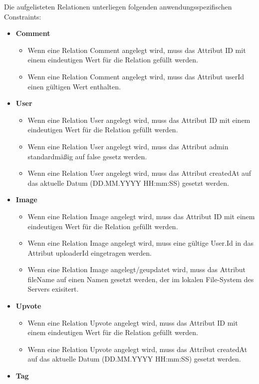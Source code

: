 \documentclass[12pt, oneside, a4paper]{article}		%
\begin{document}
Die aufgelisteten Relationen unterliegen folgenden anwendungsspezifischen Constraints:

\begin{itemize}
	\item \textbf{Comment}
	\begin{itemize}
		\item Wenn eine Relation Comment angelegt wird, muss das Attribut ID mit einem eindeutigen Wert für die Relation gefüllt werden.
		\item Wenn eine Relation Comment angelegt wird, muss das Attribut userId einen gültigen Wert enthalten.
	\end{itemize}
	\item \textbf{User}
	\begin{itemize}
		\item Wenn eine Relation User angelegt wird, muss das Attribut ID mit einem eindeutigen Wert für die Relation gefüllt werden.
		\item Wenn eine Relation User angelegt wird, muss das Attribut admin standardmäßig auf false gesetz werden.
		\item Wenn eine Relation User angelegt wird, muss das Attribut createdAt auf das aktuelle Datum (DD.MM.YYYY HH:mm:SS) gesetzt werden.
	\end{itemize}
	\item \textbf{Image}
	\begin{itemize}
		\item Wenn eine Relation Image angelegt wird, muss das Attribut ID mit einem eindeutigen Wert für die Relation gefüllt werden.
		\item Wenn eine Relation Image angelegt wird, muss eine gültige User.Id in das Attribut uploaderId eingetragen werden.
		\item Wenn eine Relation Image angelegt/geupdatet wird, muss das Attribut fileName auf einen Namen gesetzt werden, der im lokalen File-System des Servers exisitert.
	\end{itemize}
	\item \textbf{Upvote}
	\begin{itemize}
		\item Wenn eine Relation Upvote angelegt wird, muss das Attribut ID mit einem eindeutigen Wert für die Relation gefüllt werden.
		\item Wenn eine Relation Upvote angelegt wird, muss das Attribut createdAt auf das aktuelle Datum (DD.MM.YYYY HH:mm:SS) gesetzt werden.
	\end{itemize}
	\item \textbf{Tag}

\end{itemize}
\end{document}
